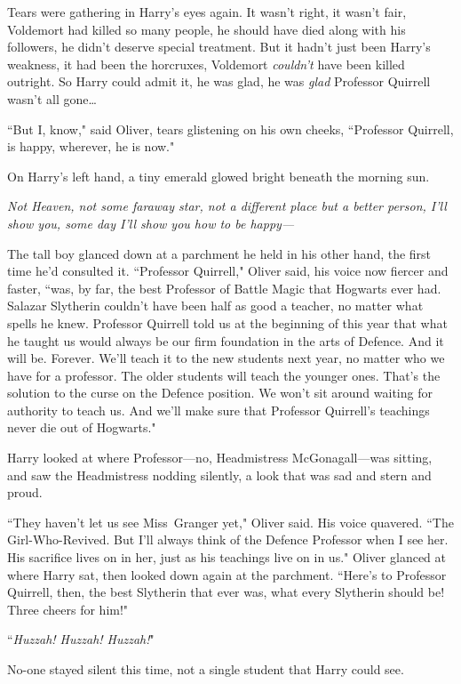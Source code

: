 Tears were gathering in Harry's eyes again. It wasn't right, it wasn't fair, Voldemort had killed so many people, he should have died along with his followers, he didn't deserve special treatment. But it hadn't just been Harry's weakness, it had been the horcruxes, Voldemort \emph{couldn't} have been killed outright. So Harry could admit it, he was glad, he was \emph{glad} Professor Quirrell wasn't all gone…

``But I, know," said Oliver, tears glistening on his own cheeks, ``Professor Quirrell, is happy, wherever, he is now."

On Harry's left hand, a tiny emerald glowed bright beneath the morning sun.

\emph{Not Heaven, not some faraway star, not a different place but a better person, I'll show you, some day I'll show you how to be happy—}

The tall boy glanced down at a parchment he held in his other hand, the first time he'd consulted it. ``Professor Quirrell," Oliver said, his voice now fiercer and faster, ``was, by far, the best Professor of Battle Magic that Hogwarts ever had. Salazar Slytherin couldn't have been half as good a teacher, no matter what spells he knew. Professor Quirrell told us at the beginning of this year that what he taught us would always be our firm foundation in the arts of Defence. And it will be. Forever. We'll teach it to the new students next year, no matter who we have for a professor. The older students will teach the younger ones. That's the solution to the curse on the Defence position. We won't sit around waiting for authority to teach us. And we'll make sure that Professor Quirrell's teachings never die out of Hogwarts."

Harry looked at where Professor—no, Headmistress McGonagall—was sitting, and saw the Headmistress nodding silently, a look that was sad and stern and proud.

``They haven't let us see Miss~Granger yet," Oliver said. His voice quavered. ``The Girl-Who-Revived. But I'll always think of the Defence Professor when I see her. His sacrifice lives on in her, just as his teachings live on in us." Oliver glanced at where Harry sat, then looked down again at the parchment. ``Here's to Professor Quirrell, then, the best Slytherin that ever was, what every Slytherin should be! Three cheers for him!"

``\emph{Huzzah! Huzzah! Huzzah!}"

No-one stayed silent this time, not a single student that Harry could see.

